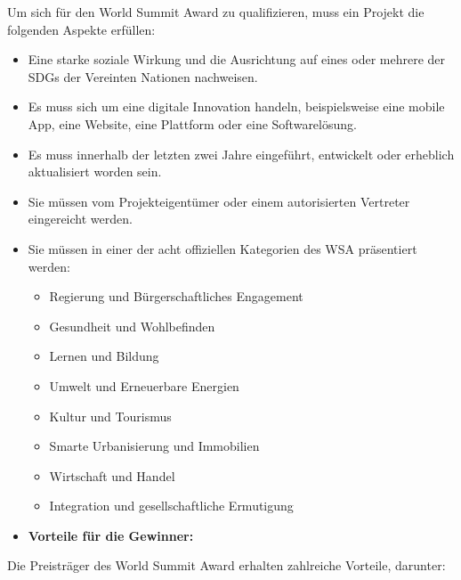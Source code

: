 Um sich für den World Summit Award zu qualifizieren, muss ein Projekt die folgenden Aspekte erfüllen:

\begin{itemize}
    \item {Eine starke soziale Wirkung und die Ausrichtung auf eines oder mehrere der SDGs der Vereinten Nationen nachweisen.}
    \item {Es muss sich um eine digitale Innovation handeln, beispielsweise eine mobile App, eine Website, eine Plattform oder eine Softwarelösung.}
    \item {Es muss innerhalb der letzten zwei Jahre eingeführt, entwickelt oder erheblich aktualisiert worden sein.}
    \item {Sie müssen vom Projekteigentümer oder einem autorisierten Vertreter eingereicht werden.}
    \item {Sie müssen in einer der acht offiziellen Kategorien des WSA präsentiert werden:}
    \begin{itemize}
        \item {Regierung und Bürgerschaftliches Engagement}
        \item {Gesundheit und Wohlbefinden}
        \item {Lernen und Bildung}
        \item {Umwelt und Erneuerbare Energien}
        \item {Kultur und Tourismus}
        \item {Smarte Urbanisierung und Immobilien}
        \item {Wirtschaft und Handel}
        \item {Integration und gesellschaftliche Ermutigung}
    \end{itemize}
\end{itemize}

\begin{itemize}
    \item \textbf{Vorteile für die Gewinner:}
\end{itemize}

Die Preisträger des World Summit Award erhalten zahlreiche Vorteile, darunter:

